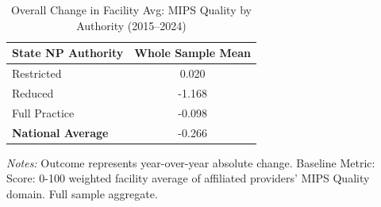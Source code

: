 \begin{table}[htbp]
    \centering
    \caption{Overall Change in Facility Avg: MIPS Quality by Authority (2015--2024)}
    \label{tab:d_fac_mips_quality_score_full}
    \vspace{0.2cm}
    \begin{tabular}{lc}
        \toprule
        \textbf{State NP Authority} & \textbf{Whole Sample Mean} \\
        \midrule
        Restricted & 0.020 \\
        Reduced & -1.168 \\
        Full Practice & -0.098 \\
        \midrule
        \textbf{National Average} & -0.266 \\
        \bottomrule
    \end{tabular}
    \vspace{0.1cm}
    \begin{minipage}{0.6\textwidth}
        \footnotesize \textit{Notes:} Outcome represents year-over-year absolute change. Baseline Metric: Score: 0-100 weighted facility average of affiliated providers' MIPS Quality domain. Full sample aggregate.
    \end{minipage}
\end{table}